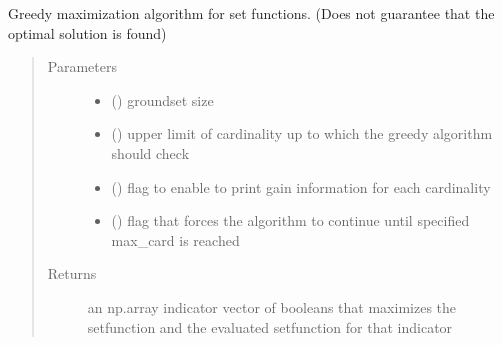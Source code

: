 \documentclass[letterpaper,10pt,english]{sphinxmanual}
\begin{document}
\begin{fulllineitems}
\begin{fulllineitems}
\end{fulllineitems}


\begin{fulllineitems}
\label{\detokenize{setFTs:setFTs.setfunctions.SetFunction.maximize_greedy}}
\sphinxAtStartPar
Greedy maximization algorithm for set functions. (Does not guarantee that the optimal solution is found)
\begin{quote}\begin{description}
\item[{Parameters}] \leavevmode\begin{itemize}
\item {} 
\sphinxAtStartPar
{} () \textendash{} groundset size

\item {} 
\sphinxAtStartPar
{} () \textendash{} upper limit of cardinality up to which the greedy algorithm should check

\item {} 
\sphinxAtStartPar
{} () \textendash{} flag to enable to print gain information for each cardinality

\item {} 
\sphinxAtStartPar
{} () \textendash{} flag that forces the algorithm to continue until specified max\_card is reached

\end{itemize}

\item[{Returns}] \leavevmode
\sphinxAtStartPar
an np.array indicator vector of booleans that maximizes the setfunction and the evaluated setfunction for that indicator


\end{description}
\end{quote}
\end{fulllineitems}
\end{fulllineitems}
\end{document}
